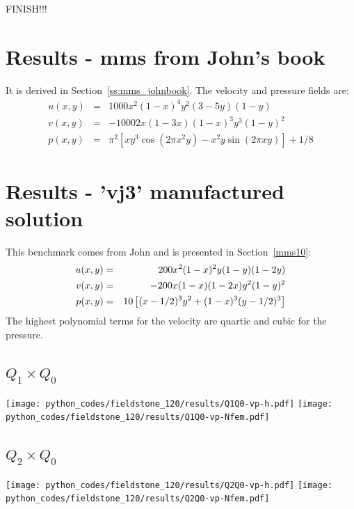 FINISH!!!


\newpage
\section*{Results - mms from John's book}

It is derived in Section~\ref{ss:mms_johnbook}. The velocity and pressure fields are:
\begin{eqnarray}
u(x,y) &=& 1000 x^2(1-x)^4  y^2 (3-5y) (1-y) \\
v(x,y) &=& -1000 2x(1-3x) (1-x)^3  y^3(1-y)^2   \\
p(x,y) &=& \pi^2 [xy^3 \cos(2\pi x^2 y) - x^2y \sin(2\pi xy) ]+1/8
\end{eqnarray}









\newpage
\section*{Results - 'vj3' manufactured solution}

This benchmark comes from John \etal \cite{jolm17} and is presented in Section~\ref{mms10}:
\begin{eqnarray}
u(x,y) &=& 200x^2(1-x)^2y(1-y)(1-2y) \nonumber\\
v(x,y) &=& -200x(1-x)(1-2x)y^2(1-y)^2 \nonumber\\
p(x,y) &=& 10\left[(x-1/2)^3y^2+(1-x)^3(y-1/2)^3 \right] \nonumber
\end{eqnarray}
The highest polynomial terms for the velocity are quartic and cubic for the pressure.

\subsection*{$Q_1\times Q_0$}
\begin{center}
\texttt{[image: python\_codes/fieldstone\_120/results/Q1Q0-vp-h.pdf]}
\texttt{[image: python\_codes/fieldstone\_120/results/Q1Q0-vp-Nfem.pdf]}
\end{center}

\subsection*{$Q_2\times Q_0$}
\begin{center}
\texttt{[image: python\_codes/fieldstone\_120/results/Q2Q0-vp-h.pdf]}
\texttt{[image: python\_codes/fieldstone\_120/results/Q2Q0-vp-Nfem.pdf]}
\end{center}

